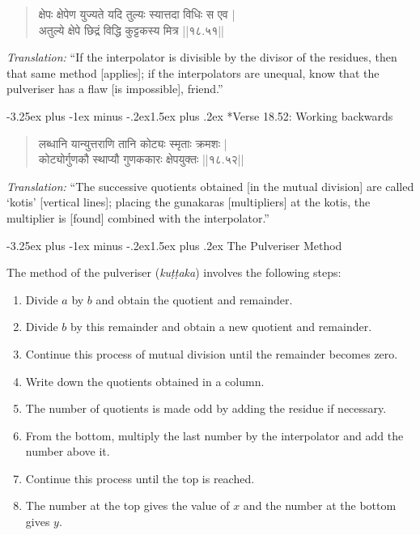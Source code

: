 \documentclass[11pt,a4paper]{article}
\makeatletter
\renewcommand{\subsection}{\@startsection{subsection}{2}{\z@}%
  {-3.25ex plus -1ex minus -.2ex}{1.5ex plus .2ex}%
  {\normalfont\large\bfseries\color{sectioncolor}}}
\renewcommand{\subsubsection}{\@startsection{subsubsection}{3}{\z@}%
  {-3.25ex plus -1ex minus -.2ex}{1.5ex plus .2ex}%
  {\normalfont\normalsize\bfseries\color{sectioncolor}}}
\newenvironment{sanskritverse}{%
  \begin{quote}
  \devanagarifont
}{%
  \end{quote}
}
\makeatother
\begin{document}
\begin{sanskritverse}
क्षेपः क्षेपेण युज्यते यदि तुल्यः स्यात्तदा विधिः स एव |\\
अतुल्ये क्षेपे छिद्रं विद्धि कुट्टकस्य मित्र ||१८.५१||
\end{sanskritverse}

\textit{Translation:} ``If the interpolator is divisible by the divisor of the residues, then that same method [applies]; if the interpolators are unequal, know that the pulveriser has a flaw [is impossible], friend.''

\subsubsection*{Verse 18.52: Working backwards}

\begin{sanskritverse}
लब्धानि यान्युत्तराणि तानि कोट्यः स्मृताः क्रमशः |\\
कोट्योर्गुणकौ स्थाप्यौ गुणककारः क्षेपयुक्तः ||१८.५२||
\end{sanskritverse}

\textit{Translation:} ``The successive quotients obtained [in the mutual division] are called `kotis' [vertical lines]; placing the gunakaras [multipliers] at the kotis, the multiplier is [found] combined with the interpolator.''

\subsection{The Pulveriser Method}

The method of the pulveriser (\textit{kuṭṭaka}) involves the following steps:

\begin{enumerate}[label=\arabic*.]
\item Divide $a$ by $b$ and obtain the quotient and remainder.
\item Divide $b$ by this remainder and obtain a new quotient and remainder.
\item Continue this process of mutual division until the remainder becomes zero.
\item Write down the quotients obtained in a column.
\item The number of quotients is made odd by adding the residue if necessary.
\item From the bottom, multiply the last number by the interpolator and add the number above it.
\item Continue this process until the top is reached.
\item The number at the top gives the value of $x$ and the number at the bottom gives $y$.
\end{enumerate}
\end{document}
